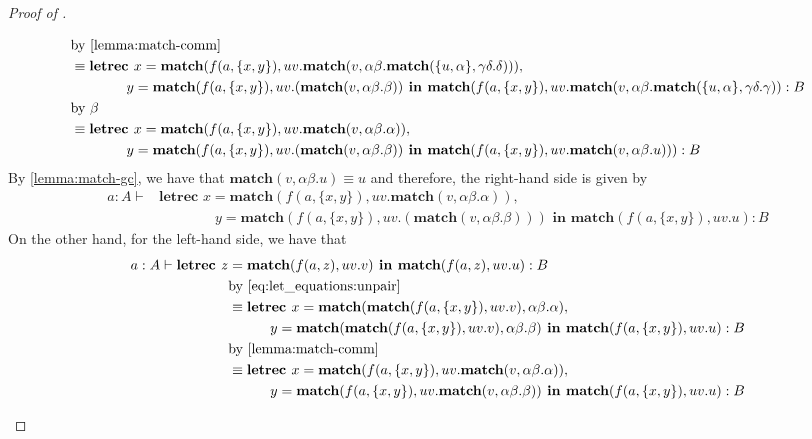 \begin{proof}[Proof of ]
\begin{itemize}
\begin{align*}
&\text{by \cref{lemma:match-comm}}\\
&\equiv \textbf{letrec } x = \textbf{match}(f(a,\{x,y\}), uv.\textbf{match}(v, \alpha\beta.\textbf{match}(\{u,\alpha\}, \gamma\delta.\delta))),\\
&\hspace{4em} y = \textbf{match}(f(a,\{x,y\}), uv.(\textbf{match}(v, \alpha\beta.\beta)) \textbf{ in } \textbf{match}(f(a,\{x,y\}), uv.\textbf{match}(v, \alpha\beta.\textbf{match}(\{u,\alpha\}, \gamma\delta.\gamma)) : B\\
&\text{by $\beta$}\\
&\equiv \textbf{letrec } x = \textbf{match}(f(a,\{x,y\}), uv.\textbf{match}(v, \alpha\beta.\alpha)),\\
&\hspace{4em} y = \textbf{match}(f(a,\{x,y\}), uv.(\textbf{match}(v, \alpha\beta.\beta)) \textbf{ in } \textbf{match}(f(a,\{x,y\}), uv.\textbf{match}(v, \alpha\beta.u))) : B\\
\end{align*}
By \cref{lemma:match-gc}, we have that $\textbf{match}(v, \alpha\beta.u) \equiv u$ and therefore, the right-hand side is given by
\begin{align*}
a : A \vdash &\textbf{letrec } x = \textbf{match}(f(a,\{x,y\}), uv.\textbf{match}(v, \alpha\beta.\alpha)),\\
&\hspace{4em} y = \textbf{match}(f(a,\{x,y\}), uv.(\textbf{match}(v,\alpha\beta.\beta))) \textbf{ in } \textbf{match}(f(a,\{x,y\}), uv.u) : B
\end{align*}
On the other hand, for the left-hand side, we have that
\begin{align*}
a : A \vdash \textbf{letrec } z &= \textbf{match}(f(a,z), uv.v) \textbf{ in } \textbf{match}(f(a,z), uv.u) : B\\
&\text{by \cref{eq:let_equations:unpair}}\\
&\equiv \textbf{letrec } x = \textbf{match}(\textbf{match}(f(a,\{x,y\}), uv.v), \alpha\beta.\alpha),\\
& \hspace{3em}y = \textbf{match}(\textbf{match}(f(a,\{x,y\}), uv.v), \alpha\beta.\beta) \textbf{ in } \textbf{match}(f(a,\{x,y\}), uv.u) : B\\ 
&\text{by \cref{lemma:match-comm}}\\
&\equiv \textbf{letrec } x = \textbf{match}(f(a,\{x,y\}), uv.\textbf{match}(v, \alpha\beta.\alpha)),\\
& \hspace{3em}y = \textbf{match}(f(a,\{x,y\}), uv.\textbf{match}(v, \alpha\beta.\beta)) \textbf{ in } \textbf{match}(f(a,\{x,y\}), uv.u) : B\\ 

\end{align*}
\end{itemize}
\end{proof}
